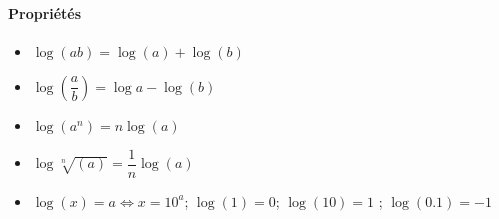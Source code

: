 \paragraph{Propriétés}
\begin{itemize}
    \item $\log{(ab)}=\log{(a)} + \log{(b)}$
    \item $\log{\left(\dfrac{a}{b}\right)}=\log{a} - \log{(b)}$
    \item $\log{(a^n)}=n\log{(a)}$
    \item $\log{\sqrt[n]{(a)}}=\dfrac{1}{n}\log{(a)}$
    \item $\log(x)=a \Leftrightarrow x=10^a $; $\log(1) = 0$; 
          $\log(10) = 1$ ; $\log(0.1) = -1$
\end{itemize}
